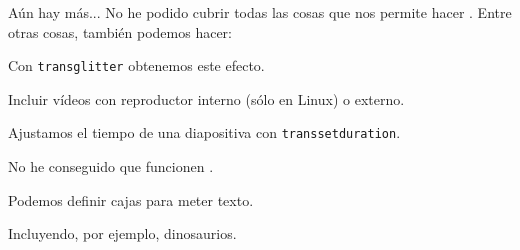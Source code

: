 \begin{frame}{Aún hay más...}
  No he podido cubrir todas las cosas que nos permite hacer \beamer \frownie{}.
  Entre otras cosas, también podemos hacer:
  \espacio
  \begin{description}[<+->]
    \item[Transiciones] Con \texttt{transglitter} obtenemos este efecto.
    \item[Multimedia] Incluir vídeos con reproductor interno (sólo en Linux) o externo.
    \item[Temporización] Ajustamos el tiempo de una diapositiva con \texttt{transsetduration}.
    \item[Animaciones] No he conseguido que funcionen \frownie{}.
    \item[Cajas] Podemos definir cajas para meter texto.
    \item[Overlays de imágenes] Incluyendo, por ejemplo, dinosaurios.
  \end{description}


\end{frame}
